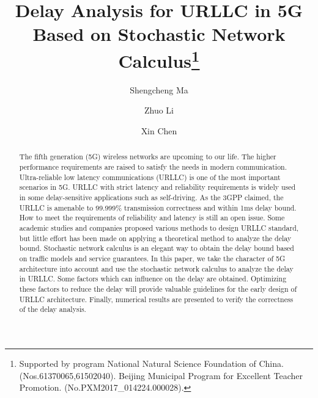 \documentclass[runningheads]{llncs}
\begin{document}
%
\title{Delay Analysis for URLLC in 5G Based on Stochastic Network Calculus\thanks{Supported by program National Natural Science Foundation of China. (Nos.61370065,61502040).
Beijing Municipal Program for Excellent Teacher Promotion. (No.PXM2017\_014224.000028).}}
%
%
\author{Shengcheng Ma \and
Zhuo Li \and
Xin Chen}
%
%
%
\maketitle              %
%
\begin{abstract}
The fifth generation (5G) wireless networks are upcoming to our life.
The higher performance requirements are raised to satisfy the needs in modern communication.
Ultra-reliable low latency communications (URLLC) is one of the most important scenarios in 5G.
URLLC with strict latency and reliability requirements is widely used in some delay-sensitive applications such as self-driving.
As the 3GPP claimed, the URLLC is amenable to 99.999\% transmission correctness and within 1ms delay bound.
How to meet the requirements of reliability and latency is still an open issue.
Some academic studies and companies proposed various methods to design URLLC standard, but little effort has been made on applying a theoretical method to analyze the delay bound.
Stochastic network calculus is an elegant way to obtain the delay bound based on traffic models and service guarantees.
In this paper, we take the character of 5G architecture into account and use the stochastic network calculus to analyze the delay in URLLC.
Some factors which can influence on the delay are obtained.
Optimizing these factors to reduce the delay will provide valuable guidelines for the early design of URLLC architecture.
Finally, numerical results are presented to verify the correctness of the delay analysis.

\end{abstract}
%
%
%
\end{document}
